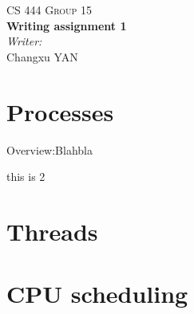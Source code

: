 \documentclass[letterpaper,10pt]{article}
\newcommand{\tab}{\hspace*{2em}} %
\begin{document}
\vfill
\begin{center}
    \textsc{\LARGE CS 444 Group 15}\\
    { \huge \bfseries Writing assignment 1 \\}
    \emph{Writer:}\\
    Changxu \textsc{YAN}
\end{center}


\section{Processes}
\tab Overview:Blahbla \cite{Love}

this is 2 \cite{Wini}

\section{Threads}



\section{CPU scheduling}



\end{document}
